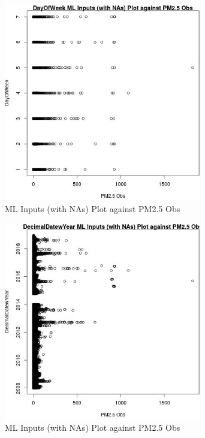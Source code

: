 \begin{figure} 
\centering  
\includegraphics[width=0.77\textwidth]{Code_Outputs/Report_ML_input_PM25_Step4_part_e_de_duplicated_aveswNAs_DayOfWeekvPM25_Obs.jpg} 
\caption{\label{fig:Report_ML_input_PM25_Step4_part_e_de_duplicated_aveswNAsDayOfWeekvPM25_Obs}ML Inputs (with NAs) Plot against PM2.5 Obs} 
\end{figure} 
 

\begin{figure} 
\centering  
\includegraphics[width=0.77\textwidth]{Code_Outputs/Report_ML_input_PM25_Step4_part_e_de_duplicated_aveswNAs_DecimalDatewYearvPM25_Obs.jpg} 
\caption{\label{fig:Report_ML_input_PM25_Step4_part_e_de_duplicated_aveswNAsDecimalDatewYearvPM25_Obs}ML Inputs (with NAs) Plot against PM2.5 Obs} 
\end{figure} 
 

